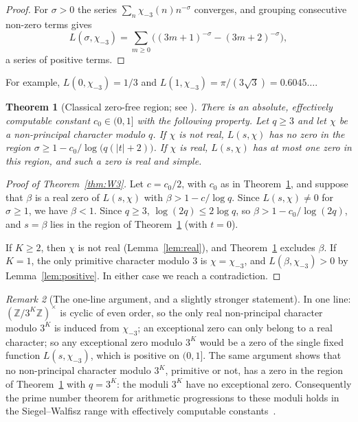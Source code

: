 \documentclass[12pt]{amsart}
\theoremstyle{plain}
\newtheorem{theorem}{Theorem}[section]
\theoremstyle{definition}
\theoremstyle{remark}
\newtheorem{remark}[theorem]{Remark}
\newcommand{\Z}{\mathbb{Z}}
\begin{document}
\begin{proof}
For $\sigma > 0$ the series $\sum_n \chi_{-3}(n)n^{-\sigma}$ converges, and
grouping consecutive non-zero terms gives
\[
  L(\sigma,\chi_{-3}) = \sum_{m \geq 0}\bigl((3m+1)^{-\sigma} - (3m+2)^{-\sigma}\bigr),
\]
a series of positive terms.
\end{proof}

For example, $L(0,\chi_{-3}) = 1/3$ and
$L(1,\chi_{-3}) = \pi/(3\sqrt3) = 0.6045\ldots$.

\begin{theorem}[Classical zero-free region; see {\cite[Ch.~14]{Davenport2000}}]
\label{thm:classical}
There is an absolute, effectively computable constant $c_0 \in (0,1]$ with
the following property. Let $q \geq 3$ and let $\chi$ be a non-principal
character modulo $q$. If $\chi$ is not real, $L(s,\chi)$ has no zero in the
region $\sigma \geq 1 - c_0/\log\bigl(q(|t|+2)\bigr)$. If $\chi$ is real,
$L(s,\chi)$ has at most one zero in this region, and such a zero is real
and simple.
\end{theorem}

\begin{proof}[Proof of Theorem~\ref{thm:W3}]
Let $c = c_0/2$, with $c_0$ as in Theorem~\ref{thm:classical}, and suppose
that $\beta$ is a real zero of $L(s,\chi)$ with $\beta > 1 - c/\log q$. Since
$L(s,\chi) \neq 0$ for $\sigma \geq 1$, we have $\beta < 1$. Since $q \geq 3$,
$\log(2q) \leq 2\log q$, so $\beta > 1 - c_0/\log(2q)$, and $s = \beta$
lies in the region of Theorem~\ref{thm:classical} (with $t = 0$).

If $K \geq 2$, then $\chi$ is not real (Lemma~\ref{lem:real}), and
Theorem~\ref{thm:classical} excludes $\beta$. If $K = 1$, the only primitive
character modulo $3$ is $\chi = \chi_{-3}$, and $L(\beta,\chi_{-3}) > 0$ by
Lemma~\ref{lem:positive}. In either case we reach a contradiction.
\end{proof}

\begin{remark}[The one-line argument, and a slightly stronger statement]
\label{rem:oneline}
In one line: $(\Z/3^K\Z)^\times$ is cyclic of even order, so the only real
non-principal character modulo $3^K$ is induced from $\chi_{-3}$; an
exceptional zero can only belong to a real character; so any exceptional
zero modulo $3^K$ would be a zero of the single fixed function
$L(s,\chi_{-3})$, which is positive on $(0,1]$. The same argument shows that
no non-principal character modulo $3^K$, primitive or not, has a zero in the
region of Theorem~\ref{thm:classical} with $q = 3^K$: the moduli $3^K$ have
no exceptional zero. Consequently the prime number theorem for arithmetic
progressions to these moduli holds in the Siegel--Walfisz range with
effectively computable constants~\cite[Ch.~20]{Davenport2000}.
\end{remark}
\end{document}
